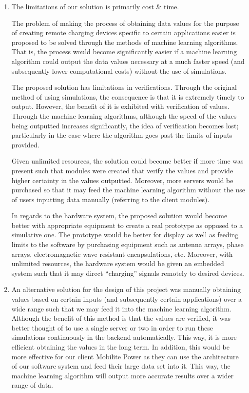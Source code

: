 \documentclass[12pt, titlepage]{article}
\begin{document}
\begin{enumerate}  
  \item The limitations of our solution is primarily cost \& time. \par The problem of making the process of obtaining data values for the purpose of creating remote charging devices specific to certain applications easier is proposed to be solved through the methods of machine learning algorithms. That is, the process would become significantly easier if a machine learning algorithm could output the data values necessary at a much faster speed (and subsequently lower computational costs) without the use of simulations. \par The proposed solution has limitations in verifications. Through the original method of using simulations, the consequence is that it is extremely timely to output. However, the benefit of it is exhibited with verification of values. Through the machine learning algorithms, although the speed of the values being outputted increases significantly, the idea of verification becomes lost; particularly in the case where the algorithm goes past the limits of inputs provided. \par Given unlimited resources, the solution could become better if more time was present such that modules were created that verify the values and provide higher certainty in the values outputted. 
  Moreover, more servers would be purchased so that it may feed the machine learning algorithm without the use of users inputting data manually (referring to the client modules). \par 
  In regards to the hardware system, the proposed solution would become better with appropriate equipment to create a real prototype as opposed to a simulative one. The prototype would be better for display as well as feeding limits to the software by purchasing equipment such as antenna arrays, phase arrays, electromagnetic wave resistant encapsulations, etc. Moreover, with unlimited resources, the hardware system would be given an embedded system such that it may direct “charging” signals remotely to desired devices.
  \item An alternative solution for the design of this project was manually obtaining values based on certain inputs (and subsequently certain applications) over a wide range such that we may feed it into the machine learning algorithm. Although the benefit of this method is that the values are verified, it was better thought of to use a single server or two in order to run these simulations continuously in the backend automatically. This way, it is more efficient obtaining the values in the long term. In addition, this would be more effective for our client Mobilite Power as they can use the architecture of our software system and feed their large data set into it. This way, the machine learning algorithm will output more accurate results over a wider range of data. \par 

\end{enumerate}
\end{document}
